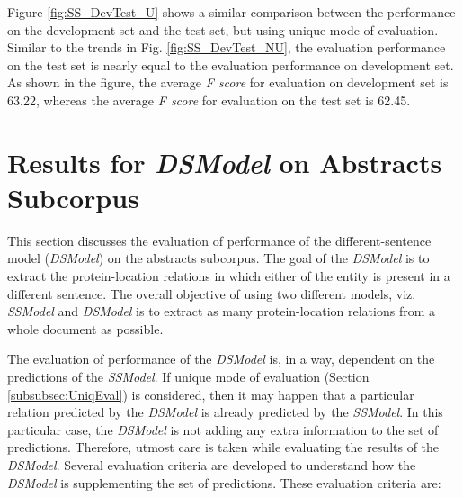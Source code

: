 Figure \ref{fig:SS_DevTest_U} shows a similar comparison between the performance on the development set and the test set, but using unique mode of evaluation. Similar to the trends in Fig. \ref{fig:SS_DevTest_NU}, the evaluation performance on the test set is nearly equal to the evaluation performance on development set. As shown in the figure, the average \textit{F score} for evaluation on development set is 63.22, whereas the average \textit{F score} for evaluation on the test set is 62.45.

\section{Results for \textit{DSModel} on Abstracts Subcorpus}

This section discusses the evaluation of performance of the different-sentence model (\textit{DSModel}) on the abstracts subcorpus. The goal of the \textit{DSModel} is to extract the protein-location relations in which either of the entity is present in a different sentence. The overall objective of using two different models, viz. \textit{SSModel} and \textit{DSModel} is to extract as many protein-location relations from a whole document as possible.

The evaluation of performance of the \textit{DSModel} is, in a way, dependent on the predictions of the \textit{SSModel}. If unique mode of evaluation (Section \ref{subsubsec:UniqEval}) is considered, then it may happen that a particular relation predicted by the \textit{DSModel} is already predicted by the \textit{SSModel}. In this particular case, the \textit{DSModel} is not adding any extra information to the set of predictions. Therefore, utmost care is taken while evaluating the results of the \textit{DSModel}. Several evaluation criteria are developed to understand how the \textit{DSModel} is supplementing the set of predictions. These evaluation criteria are:

